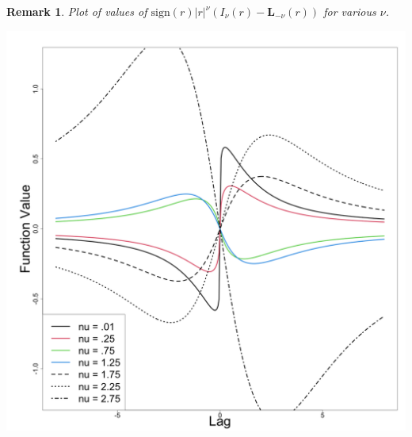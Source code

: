 \documentclass[11pt]{article}
\newtheorem*{remark}{Remark}
\begin{document}
\begin{remark}
Plot of values of $\textrm{sign}(r)|r|^\nu(I_\nu(r) - \boldsymbol{L}_{-\nu}(r))$ for various $\nu$.

\centering
\includegraphics[scale = .15]{../example_fun.png}

\end{remark}
\end{document}
